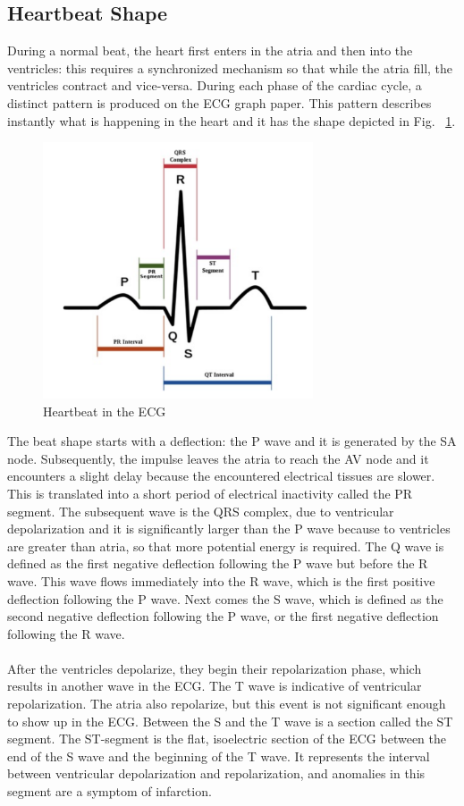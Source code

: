 \documentclass[LaM,binding=0.6cm]{sapthesis}
\begin{document}
\subsection{Heartbeat Shape}
During a normal beat, the heart first enters in the atria and then into the ventricles: this requires a synchronized mechanism so that while the atria fill, the ventricles contract and vice-versa. During each phase of the cardiac cycle, a distinct pattern is produced on the ECG graph paper. This pattern describes instantly what is happening in the heart and it has the shape depicted in Fig. ~\ref{fig:beatshape}.
\begin{figure}   \centering
    \includegraphics[width=80mm,scale=0.7]{beatshape}
    \caption{Heartbeat in the ECG}
    \label{fig:beatshape}
\end{figure}
The beat shape starts with a deflection: the P wave and it is generated by the SA node. Subsequently, the impulse leaves the atria to reach the AV node and it encounters a slight delay because the encountered electrical tissues are slower. This is translated into a short period of electrical inactivity called the PR segment. The subsequent wave is the QRS complex, due to ventricular depolarization and it is significantly larger than the P wave because to ventricles are greater than atria, so that more potential energy is required. The Q wave is defined as the first negative deflection following the P wave but before the R wave. This wave flows immediately into the R wave, which is the first positive deflection following the P wave. Next comes the S wave, which is defined as the second negative deflection following the P wave, or the first negative deflection following the R wave.\\\\After the ventricles depolarize, they begin their repolarization phase, which results in another wave in the ECG. The T wave is indicative of ventricular repolarization. The atria also repolarize, but this event is not significant enough to show up in the ECG. Between the S and the T wave is a section called the ST segment. The ST-segment is the flat, isoelectric section of the ECG between the end of the S wave and the beginning of the T wave. It represents the interval between ventricular depolarization and repolarization, and anomalies in this segment are a symptom of infarction.
\end{document}
